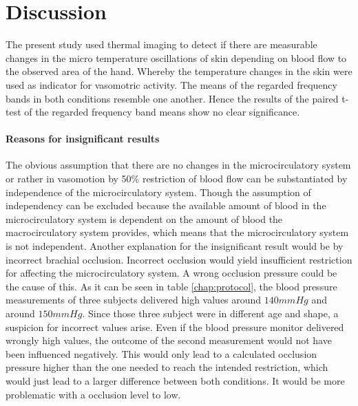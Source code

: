 \chapter{Discussion}

The present study used thermal imaging to detect if there are measurable changes in the micro temperature oscillations of skin depending on blood flow to the observed area of the hand. Whereby the temperature changes in the skin were used as indicator for vasomotric activity. %
The means of the regarded frequency bands in both conditions resemble one another. Hence the results of the paired t-test of the regarded frequency band means show no clear significance.  %

\subsubsection{Reasons for insignificant results}
The obvious assumption that there are no changes in the microcirculatory system or rather in vasomotion by 50\% restriction of blood flow can be substantiated by independence of the microcirculatory system. Though the assumption of independency can be excluded because the available amount of blood in the microcirculatory system is dependent on the amount of blood the macrocirculatory system provides, which means that the microcirculatory system is not independent. 
Another explanation for the insignificant result would be by incorrect brachial occlusion. Incorrect occlusion would yield insufficient restriction for affecting the microcirculatory system. %
A wrong occlusion pressure could be the cause of this. As it can be seen in table \ref{chap:protocol}, the blood pressure measurements of three subjects delivered high values around $140 mmHg$ and around $150 mmHg$. Since those three subject were in different age and shape, a suspicion for incorrect values arise. %
Even if the blood pressure monitor delivered wrongly high values, the outcome of the second measurement would not have been influenced negatively. This would only lead to a calculated occlusion pressure higher than the one needed to reach the intended restriction, which would just lead to a larger difference between both conditions. It would be more problematic with a occlusion level to low.  %

